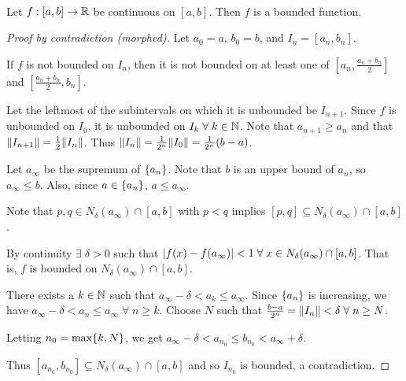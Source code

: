 \begin{thm} \label{thm:cont:compact->bounded} ~\\
    Let $f : [a, b] \to \mathbb{R}$ be continuous on $[a, b]$. Then $f$ is a bounded function.
\end{thm}
\begin{proof}[Proof by contradiction \textcolor{self_proof}{(morphed)}]
    Let $a_{0} = a$, $b_{0} = b$, and $I_{n} = [a_{n}, b_{n}]$.

    If $f$ is not bounded on $I_{n}$, then it is not bounded on at least one of $[a_{n}, \frac{a_{n} + b_{n}}{2}]$ and $[\frac{a_{n} + b_{n}}{2}, b_{n}]$.

    Let the leftmost of the subintervals on which it is unbounded be $I_{n+1}$.
    Since $f$ is unbounded on $I_{0}$, it is unbounded on $I_{k} \;\forall\; k \in \mathbb{N}$.
    Note that $a_{n+1} \geq a_{n}$ and that $\norm{I_{n+1}} = \frac{1}{2} \norm{I_{n}}$.
    Thus $\norm{I_{n}} = \frac{1}{2^{n}} \norm{I_{0}} = \frac{1}{2^{n}} (b - a)$.

    Let $a_{\infty}$ be the supremum of $\set{a_{n}}$.
    Note that $b$ is an upper bound of $a_{n}$, so $a_{\infty} \leq b$.
    Also, since $a \in \set{a_{n}}$, $a \leq a_{\infty}$.

    Note that $p, q \in N_{\delta}(a_{\infty}) \cap [a, b]$ with $p < q$ implies $[p, q] \subseteq N_{\delta}(a_{\infty}) \cap [a, b]$.

    By continuity $\exists\; \delta > 0$ such that $\abs{f(x) - f(a_{\infty})} < 1 \;\forall\; x \in N_{\delta}(a_{\infty}) \cap [a, b]$.
    That is, $f$ is bounded on $N_{\delta}(a_{\infty}) \cap [a, b]$.

    There exists a $k \in \mathbb{N}$ such that $a_{\infty} - \delta < a_{k} \leq a_{\infty}$.
    Since $\set{a_{n}}$ is increasing, we have $a_{\infty} - \delta < a_{n} \leq a_{\infty} \;\forall\; n \geq k$.
    Choose $N$ such that $\frac{b - a}{2^{n}} = \norm{I_{n}} < \delta \;\forall\; n \geq N$.

    Letting $n_{0} = \max \set{k, N}$, we get $a_{\infty} - \delta < a_{n_{0}} \leq b_{n_{0}} < a_{\infty} + \delta$.

    Thus $[a_{n_{0}}, b_{n_{0}}] \subseteq N_{\delta}(a_{\infty}) \cap [a, b]$ and so $I_{n_{0}}$ is bounded, a contradiction.
\end{proof}
